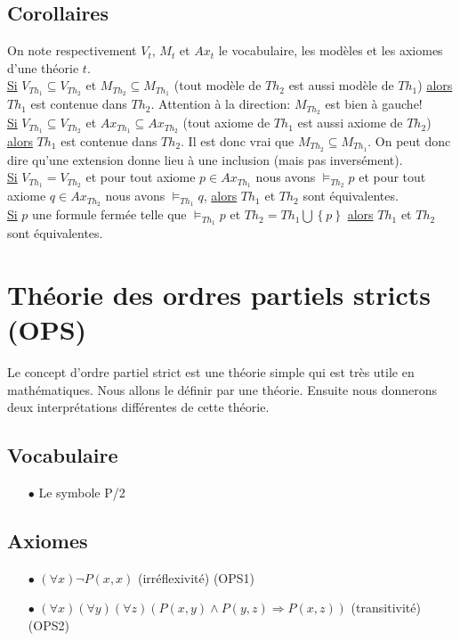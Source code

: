 {\subsection{Corollaires}
On note respectivement $V_t$, $M_t$ et $Ax_t$ le vocabulaire, les modèles et les axiomes d'une théorie $t$. \\

\noindent \underline{Si} $V_{Th_1} \subseteq V_{Th_2}$ et $M_{Th_2} \subseteq M_{Th_1}$
(tout modèle de $Th_2$ est aussi modèle de $Th_1$) \underline{alors} $Th_1$ est contenue dans $Th_2$.
Attention à la direction: $M_{Th_2}$ est bien à gauche!
\\

\noindent \underline{Si} $V_{Th_1} \subseteq V_{Th_2}$ et $Ax_{Th_1} \subseteq Ax_{Th_2}$
(tout axiome de $Th_1$ est aussi axiome de $Th_2$) \underline{alors} $Th_1$ est contenue dans $Th_2$.
Il est donc vrai que $M_{Th_2} \subseteq M_{Th_1}$.
On peut donc dire qu'une extension donne lieu à une inclusion (mais pas inversément).\\

\noindent \underline{Si} $V_{Th_1} = V_{Th_2}$ 
et pour tout axiome $p \in Ax_{Th_1}$ nous avons $\models_{Th_2} p$
et pour tout axiome $q \in Ax_{Th_2}$ nous avons $\models_{Th_1} q$,
\underline{alors}
$Th_1$ et $Th_2$ sont équivalentes. \\

\noindent \underline{Si} $p$ une formule fermée telle que $\models_{Th_1} p$ et $Th_2 = Th_1 \bigcup \left\lbrace p \right\rbrace$ \underline{alors} $Th_1$ et $Th_2$ sont équivalentes. \\

\section{Théorie des ordres partiels stricts (OPS)}

Le concept d'ordre partiel strict est une théorie simple qui est très utile en mathématiques.
Nous allons le définir par une théorie.
Ensuite nous donnerons deux interprétations différentes de cette théorie.
\subsection*{Vocabulaire}
\begin{itemize}
\item[$\bullet$] Le symbole P/2
\end{itemize}
\subsection*{Axiomes}
\begin{itemize}
\item[$\bullet$] $ (\forall x) \neg P(x,x) $  (irréflexivité) (OPS1)
\item[$\bullet$] $ (\forall x) (\forall y) (\forall z) (P(x,y) \wedge P(y,z) \Rightarrow P(x,z))$ (transitivité) (OPS2)
\end{itemize}
}
